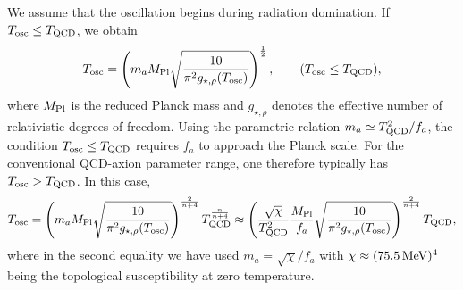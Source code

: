 \documentclass[review]{elsarticle}
\numberwithin{equation}{section}
\numberwithin{table}{section}
\numberwithin{figure}{section}
\begin{document}
We assume that the oscillation begins during radiation domination. If $T_{\rm osc}\leq T_{\rm QCD}$, we obtain
\begin{align}
    T_{\rm osc}
    =\left(m_a M_{\rm Pl} \sqrt{\frac{10}{\pi^2 g_{\star,\rho}(T_{\rm osc})}}\right)^{\frac{1}{2}},
    \qquad
    (T_{\rm osc}\leq T_{\rm QCD}),
\end{align}
where $M_{\rm Pl}$ is the reduced Planck mass and $g_{\star,\rho}$ denotes the effective number of relativistic degrees of freedom. Using the parametric relation $m_a\simeq T_{\rm QCD}^2/f_a$, the condition $T_{\rm osc}\leq T_{\rm QCD}$ requires $f_a$ to approach the Planck scale. For the conventional QCD-axion parameter range, one therefore typically has $T_{\rm osc}>T_{\rm QCD}$. In this case,
\begin{align}
    T_{\rm osc}
    =\left(m_a M_{\rm Pl} \sqrt{\frac{10}{\pi^2 g_{\star,\rho}(T_{\rm osc})}}\right)^{\frac{2}{n+4}} T_{\rm QCD}^{\frac{n}{n+4}}
    \approx \left(\frac{\sqrt{\chi}}{T_{\rm QCD}^2} \frac{M_{\rm Pl}}{f_a} \sqrt{\frac{10}{\pi^2 g_{\star,\rho}(T_{\rm osc})}}\right)^{\frac{2}{n+4}} T_{\rm QCD} ,
\end{align}
where in the second equality we have used $m_a=\sqrt{\chi}/f_a$ with $\chi\approx (75.5\,{\rm MeV})^4$~\cite{Borsanyi:2016ksw,GrilliDiCortona:2015jxo,Gorghetto:2018ocs} being the topological susceptibility at zero temperature.
\end{document}
